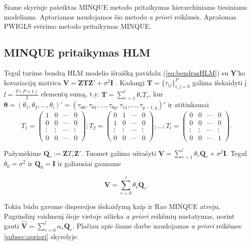 \documentclass[11pt,a4paper]{article}
\begin{document}
\indent Šiame skyriuje pateiktas MINQUE metodo pritaikymas hierarchiniams tiesiniams modeliams. Aptariamos naudojamos šio metodo \textit{a priori} reikšmės. Aprašomas PWIGLS svėrimo metodo pritaikymas MINQUE.
\subsection{MINQUE pritaikymas HLM}
Tegul turime bendrą HLM modelio išraišką pavidalu (\ref{eq:bendrasHLM}) su $\mathbf{Y}$'ko kovariacijų matrica $\mathbf{V}=\mathbf{ZTZ'}+\sigma^2\mathbf{I}$ . Kadangi $\mathbf{T}=\{\tau_{ij}\}^P_{i,j=0}$ galima išskaidyti į $l=\frac{P(P+1)}{2}$ elementų sumą, t.y.
$\mathbf{T}=\sum^l_{r=1}\theta_rT_r$, kur $\boldsymbol{\theta} = (\theta_1,\theta_2,\dots,\theta_l)'=(\tau_{00}, \tau_{01}, \dots, \tau_{0q}, \tau_{11},\dots, \tau_{q-1,q})'$ ir atitinkamai
\[
T_1=
\begin{pmatrix}
1&0&\cdots&0 \\
0&0&\cdots&0 \\
\vdots&\vdots& \cdots &\vdots \\
0&0&\cdots&0
\end{pmatrix};
T_2=
\begin{pmatrix}
0&1&\cdots&0 \\
1&0&\cdots&0 \\
\vdots&\vdots& \cdots &\vdots \\
0&0&\cdots&0
\end{pmatrix};
\dots;
T_l=
\begin{pmatrix}
0&0&\cdots&0 \\
0&0&\cdots&0 \\
\vdots&\vdots& \cdots &\vdots \\
0&0&\cdots&1
\end{pmatrix}.
\]

Pažymėkime $\mathbf{Q}_r:= \mathbf{Z}T_r\mathbf{Z'}$. Tuomet galima užrašyti $\mathbf{V}=\sum^l_{r=1}\theta_r\mathbf{Q}_r+\sigma^2 \mathbf{I}$. Tegul $\theta_0 = \sigma^2$ ir $\mathbf{Q}_0=\mathbf{I}$ ir galiausiai gauname

\begin{equation*}
\mathbf{V}=\sum^l_{r=0} \theta_r\mathbf{Q}_r.
\end{equation*}

Tokiu būdu gavome dispersijos išskaidymą kaip ir Rao MINQUE atveju. Pagrindinį vaidmenį šioje vietoje atlieka \textit{a priori} reikšmių nustatymas, norint gauti $\mathbf{\hat{V}}=\sum^l_{r=0} \alpha_r\mathbf{Q}_r$. Plačiau apie šiame darbe naudojamas \textit{a priori} reikšmes \ref{subsec:apriori} skyrelyje. 
\end{document}
